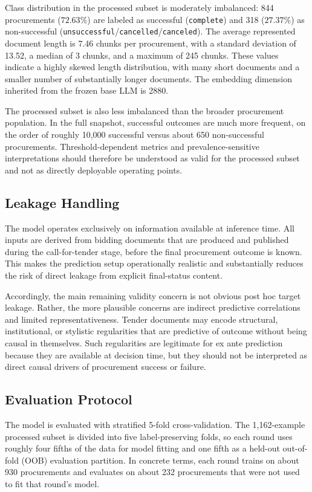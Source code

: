 \documentclass[conference]{IEEEtran}
\begin{document}
Class distribution in the processed subset is moderately imbalanced: 844 procurements ($72.63\%$) are labeled as successful (\texttt{complete}) and 318 ($27.37\%$) as non-successful (\texttt{unsuccessful}/\texttt{cancelled}/\texttt{canceled}). The average represented document length is 7.46 chunks per procurement, with a standard deviation of 13.52, a median of 3 chunks, and a maximum of 245 chunks. These values indicate a highly skewed length distribution, with many short documents and a smaller number of substantially longer documents. The embedding dimension inherited from the frozen base LLM is 2880.

The processed subset is also less imbalanced than the broader procurement population. In the full snapshot, successful outcomes are much more frequent, on the order of roughly 10{,}000 successful versus about 650 non-successful procurements. Threshold-dependent metrics and prevalence-sensitive interpretations should therefore be understood as valid for the processed subset and not as directly deployable operating points.

\subsection{Leakage Handling}
The model operates exclusively on information available at inference time. All inputs are derived from bidding documents that are produced and published during the call-for-tender stage, before the final procurement outcome is known. This makes the prediction setup operationally realistic and substantially reduces the risk of direct leakage from explicit final-status content.

Accordingly, the main remaining validity concern is not obvious post hoc target leakage. Rather, the more plausible concerns are indirect predictive correlations and limited representativeness. Tender documents may encode structural, institutional, or stylistic regularities that are predictive of outcome without being causal in themselves. Such regularities are legitimate for ex ante prediction because they are available at decision time, but they should not be interpreted as direct causal drivers of procurement success or failure.

\subsection{Evaluation Protocol}
The model is evaluated with stratified 5-fold cross-validation. The 1{,}162-example processed subset is divided into five label-preserving folds, so each round uses roughly four fifths of the data for model fitting and one fifth as a held-out out-of-fold (OOB) evaluation partition. In concrete terms, each round trains on about 930 procurements and evaluates on about 232 procurements that were not used to fit that round's model.
\end{document}
